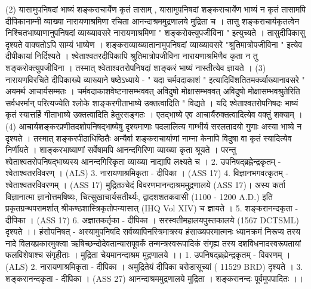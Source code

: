 (2) यासामुपनिषदां भाष्यं शङ्कराचार्येण कृतं तासाम् , यासामुपनिषदां शङ्कराचार्येण भाष्यं न कृतं तासामपि दीपिकानाम्नी व्याख्या नारायणाश्रमिणा रचिता आनन्दाश्रममुद्रणालये मुद्रिता च । तासु शङ्कराचार्यकृतत्वेन निश्चितभाष्याणानुपनिषदां व्याख्यावसरे नारायणाश्रमिणा " शङ्करोक्त्युपजीविना " इत्युच्यते । तासुदीपिकासु दृश्यते वाक्यतोऽपि साम्यं भाष्येण । शङ्कराव्याख्यातानामुपनिषदां व्याख्यावसरे "श्रुतिमात्रोपजीविना " इत्येव दीपीकायां निर्दिश्यते । श्वेताश्वतरदीपिकापि श्रुतिमात्रोपजीविना नारायणाश्रमिणैव कृता न तु शङ्करोक्त्युपजीविना । तस्मात् श्वेताश्वतरोपनिषदां शाङ्करं भाष्यं नास्तीत्येव ज्ञायते । 
(3) नारायणविरचिते दीपिकाख्ये व्याख्याने षष्ठेऽध्याये - " यदा चर्मवदाकाशं " इत्यादिविंशतितमर्क्व्याख्यानावसरे " अयमर्थ आचार्यसम्मतः । चर्मवदाकाशवेष्टनासम्भववत् अविदुषो मोक्षासम्भववत् अविदुषो मोक्षासम्भवश्रुतेरिति सर्वधरर्मान् परित्यज्येति श्लोके शाङ्करगीताभाष्ये उक्तत्वादिति " विद्यते । यदि श्वेताश्वतरोपनिषदः भाष्यं कृतं स्यात्तर्हि गीताभाष्ये उक्तत्वादिति हेतुरसङ्गतः । एतद्भाष्ये एव आचार्यैरुक्तत्वादित्येव वक्तुं शक्याम् । 
(4) आचार्यशङ्करप्रणीतदशोपनिषद्भाष्येषु दृश्यमाणाः पदलालित्य गाम्भीर्य सरलतादयो गुणाः अस्या भाष्ये न दृश्यते । तस्मात् शङ्करपीठाधिष्ठितैः अन्यैर्वा शङ्कराचार्याणां नाम्ना केनापि विदुषा वा कृतं स्यादित्येव निर्णीयते । शाङ्करभाष्याणां सर्वेषामपि आनन्दगिरिणा व्याख्या कृता श्रूयते । परन्तु श्वेताश्वतरोपनिषद्भाष्यस्य आनन्दगिरिकृता व्याख्या नाद्यापि लक्ष्यते च ।
2. उपनिषद्ब्रह्नेन्द्रकृतम् - श्वेताश्वतरविवरण् । (ALS) 
3. नारायणाश्रमिकृता - दीपिका । (ASS 17)
4. विज्ञानभगवत्कृतम् - श्वेताश्वतरविवरणम् । (ASS 17) 
मुद्रितञ्चेदं विवरणमानन्दाश्रममुद्रणालये (ASS 17)। अस्य कर्ता विज्ञानात्मा ज्ञानोत्तमषिष्यः, चित्सुखाचार्यसतीर्थ्यः, द्वादशशतकवासी (1100 - 1200 A.D.) इति प्रकृतग्रन्थपरामर्शात् श्रीकण्ठशास्त्रिकृतोपन्यासात् (IHQ Vol XIV) च ज्ञायते । 
5. शङ्करानन्दकृता - दीपिका । (ASS 17)
6. अज्ञातकर्तृका - दीपिका । सरस्वतीमहालयपुस्तकालये (1567 DCTSML) दृश्यते ।। 
हंसोपनिषत् - 
अस्यामुपनिषदि सर्वव्यापिनस्त्रिमात्रस्य हंसाख्यपरमात्मनः ध्यानक्रमं निरूप्य तस्य नादे विलयप्रकारमुक्त्वा ऋषिच्छन्दोदेवतान्यासपूवर्कं तन्मन्त्रस्वरूपादिकं संगृह्य तस्य दशविधनादस्वरूपतायां फलविशेषाश्च संगृहीताः । मुद्रिता चेयमानन्दाश्रम मुद्रणालये ।।
1. उपनिषद्ब्रह्मेन्द्रकृतम् - विवरणम् । (ALS)
2. नारायणाश्रमिकृता - दीपिका । अमुद्रितेयं दीपिका बरोडासूच्यां ( 11529 BRD) दृश्यते । 
3. शङ्करानन्दकृता - दीपिका । (ASS 27) आनन्दाश्रममुद्रणालये मुद्रिता । शङ्करानन्दः पूर्वमुपपादितः ।। 
